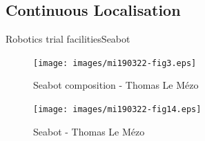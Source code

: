 \documentclass[9pt, xcolor={usenames, dvipsnames}]{beamer}
\begin{document}
			\subsection{Continuous Localisation}
			
				\begin{frame}{Robotics trial facilities}{Seabot~}
					\centering
					\begin{minipage}{0.45\textwidth}
						\begin{figure}
							\texttt{[image: images/mi190322-fig3.eps]}
							\caption{Seabot composition - Thomas Le Mézo}
						\end{figure}
					\end{minipage}
					\hspace{1cm}
					\begin{minipage}{0.3\textwidth}
						\begin{figure}
							\texttt{[image: images/mi190322-fig14.eps]}
							\caption{Seabot - Thomas Le Mézo}
						\end{figure}
					\end{minipage}
				\end{frame}
\end{document}
